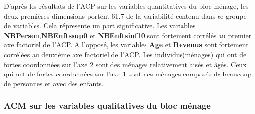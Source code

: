 \documentclass[11pt,a4paper, x11names]{article}\usepackage[]{graphicx}\usepackage[]{color}
\makeatletter
\newenvironment{kframe}{%
 \def\at@end@of@kframe{}%
 \ifinner\ifhmode%
  \def\at@end@of@kframe{\end{minipage}}%
  \begin{minipage}{\columnwidth}%
 \fi\fi%
 \def\FrameCommand##1{\hskip\@totalleftmargin \hskip-\fboxsep
 \colorbox{shadecolor}{##1}\hskip-\fboxsep
     \hskip-\linewidth \hskip-\@totalleftmargin \hskip\columnwidth}%
 \MakeFramed {\advance\hsize-\width
   \@totalleftmargin\z@ \linewidth\hsize
   \@setminipage}}%
 {\par\unskip\endMakeFramed%
 \at@end@of@kframe}
\newenvironment{knitrout}{}{} %
\makeatother
\begin{document}
D'après les résultats de l'ACP sur les variables quantitatives du bloc ménage,
les deux premières dimensions portent 61.7 de la variabilité contenu dans ce groupe de variables. Cela répresente un part significative. Les variables \textbf{NBPerson},\textbf{NBEnftssup0} et \textbf{NBEnftsinf10} sont fortement corrélés au premier axe factoriel de l'ACP. A l'opposé, les variables  \textbf{Age} et \textbf{Revenus} sont fortement corrélées au deuxième axe factoriel de l'ACP. Les individus(ménages) qui ont de fortes coordonnées sur l'axe 2 sont des ménages relativement aisés et âgés. Ceux qui ont de fortes coordonnées sur l'axe 1 sont des ménages composés de beaucoup de personnes et avec des enfants.

\subsubsection{ACM sur les variables qualitatives du bloc ménage}
\begin{minipage}{0.49\linewidth}
\begin{mdframed}
\begin{knitrout}
\color{fgcolor}\begin{kframe}


{\ttfamily\noindent\bfseries\color{errorcolor}{\#\# Error in get\_eig(X): objet 'res.mca\_logement' introuvable}}\end{kframe}
\end{knitrout}
\end{mdframed}
\end{minipage}
\hfill
\begin{minipage}{0.49\linewidth}
\begin{mdframed}
\begin{knitrout}
\color{fgcolor}\begin{kframe}


{\ttfamily\noindent\bfseries\color{errorcolor}{\#\# Error in .get\_facto\_class(X): objet 'res.mca\_logement' introuvable}}\end{kframe}
\end{knitrout}
\end{mdframed}
\end{minipage}
\vfill
\begin{minipage}{0.49\linewidth}
\begin{mdframed}
\begin{knitrout}
\color{fgcolor}\begin{kframe}


{\ttfamily\noindent\bfseries\color{errorcolor}{\#\# Error in .get\_facto\_class(X): objet 'res.mca\_logement' introuvable}}

{\ttfamily\noindent\bfseries\color{errorcolor}{\#\# Error in .get\_facto\_class(X): objet 'res.mca\_logement' introuvable}}\end{kframe}
\end{knitrout}
\end{mdframed}
\end{minipage}
\end{document}
